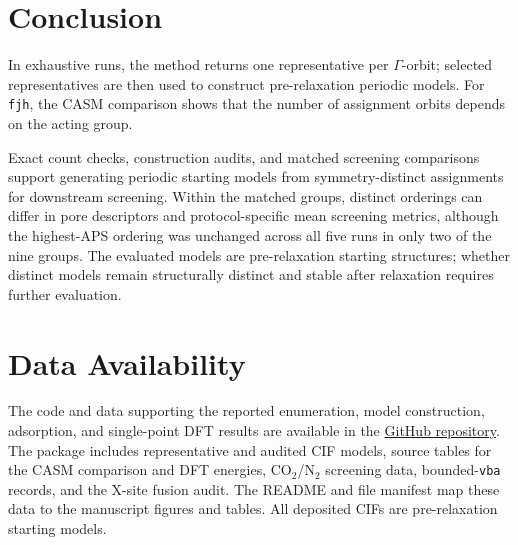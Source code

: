 \documentclass[a5paper, 10pt]{article}
\begin{document}
\section{Conclusion}
\label{sec:discussion}
In exhaustive runs, the method returns one representative per $\Gamma$-orbit; selected representatives are then used to construct pre-relaxation periodic models. For \texttt{fjh}, the CASM comparison shows that the number of assignment orbits depends on the acting group.

Exact count checks, construction audits, and matched screening comparisons support generating periodic starting models from symmetry-distinct assignments for downstream screening. Within the matched groups, distinct orderings can differ in pore descriptors and protocol-specific mean screening metrics, although the highest-APS ordering was unchanged across all five runs in only two of the nine groups. The evaluated models are pre-relaxation starting structures; whether distinct models remain structurally distinct and stable after relaxation requires further evaluation.

\section*{Data Availability}
\label{sec:data}
The code and data supporting the reported enumeration, model construction, adsorption, and single-point DFT results are available in the \href{https://github.com/Buct454/mof-enumeration-reconstruction.git}{GitHub repository}. The package includes representative and audited CIF models, source tables for the CASM comparison and DFT energies, CO$_2$/N$_2$ screening data, bounded-\texttt{vba} records, and the X-site fusion audit. The README and file manifest map these data to the manuscript figures and tables. All deposited CIFs are pre-relaxation starting models.
\end{document}
